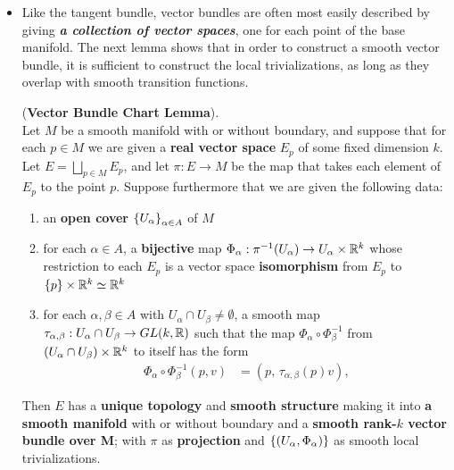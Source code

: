 \documentclass[11pt]{article}
\begin{document}
\begin{itemize}
\item Like the tangent bundle, vector bundles are often most easily described by giving \emph{\textbf{a collection of vector spaces}}, one for each point of the base manifold. The next lemma shows that in order to construct a smooth vector bundle, it is sufficient to construct the local trivializations, as long as they overlap with smooth transition
functions. 
\begin{lemma} (\textbf{Vector Bundle Chart Lemma}). \citep{lee2003introduction} \\
Let $M$ be a smooth manifold with or without boundary, and suppose that for each $p \in M$ we are given a \textbf{real vector space} $E_p$ of some fixed dimension $k$. Let $E = \bigsqcup_{p\in M} E_p$, and let $\pi: E \rightarrow M$ be the map that takes each element of $E_p$ to the point $p$. Suppose furthermore that we are
given the following data:
\begin{enumerate}
\item an \textbf{open cover} $\left\{U_{\alpha}\right\}_{\alpha \in A}$ of $M$
\item for each $\alpha \in A$, a \textbf{bijective} map $\Phi_{\alpha}: \pi^{-1}(U_{\alpha}) \rightarrow U_{\alpha} \times {\mathbb R}^k$ whose restriction to each $E_p$ is a vector space \textbf{isomorphism} from $E_p$ to $\left\{p\right\} \times {\mathbb R}^k \simeq {\mathbb R}^k$
\item for each $\alpha, \beta \in A$  with $U_{\alpha} \cap U_{\beta} \neq \emptyset$, a smooth map $\tau_{\alpha, \beta}: U_{\alpha} \cap U_{\beta} \rightarrow  GL(k, {\mathbb R})$ such that the map $\Phi_{\alpha} \circ \Phi_{\beta}^{-1}$ from $(U_{\alpha} \cap U_{\beta}) \times {\mathbb R}^k$ to itself has the form
\begin{align}
\Phi_{\alpha} \circ \Phi_{\beta}^{-1}(p,v)  &=  (p,  \, \tau_{\alpha, \beta}(p)v),  \label{eqn: change_of_coordinate_vector_bundle}
\end{align}
\end{enumerate}
Then $E$ has a \textbf{unique topology} and \textbf{smooth structure} making it into \textbf{a smooth manifold} with or without boundary and a \textbf{smooth rank-$k$ vector bundle over M}; with $\pi$ as \textbf{projection} and $\left\{(U_{\alpha}, \Phi_{\alpha})\right\}$ as smooth local trivializations.
\end{lemma}
\end{itemize} 
\end{document}
